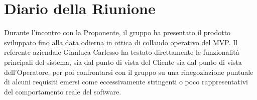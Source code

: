 \documentclass[a4paper, 11pt, oneside]{scrartcl}
\begin{document}
\newpage
\section{Diario della Riunione}
Durante l'incontro con la Proponente, il gruppo ha presentato il prodotto sviluppato fino alla data odierna in ottica di collaudo operativo del MVP. Il referente aziendale Gianluca Carlesso ha testato direttamente le funzionalità principali del sistema, sia dal punto di vista del Cliente sia dal punto di vista dell'Operatore, per poi confrontarsi con il gruppo su una rinegoziazione puntuale di alcuni requisiti emersi come eccessivamente stringenti o poco rappresentativi del comportamento reale del software.
\end{document}
